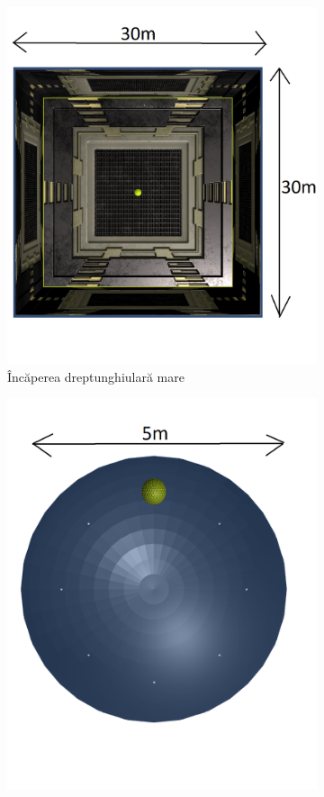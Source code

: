 \begin{figure}[!htb]
\begin{subfigure}[b]{.3\textwidth}
			\includegraphics[width=1\linewidth]{imagini/bigRoom.png}
			\caption{\^{I}nc\u{a}perea dreptunghiular\u{a} mare}
		\end{subfigure}
		\hfill
		\begin{subfigure}[b]{.3\textwidth}
			\centering
			\includegraphics[width=1\linewidth]{imagini/sphericRoom.png}

\end{subfigure}
\end{figure}
